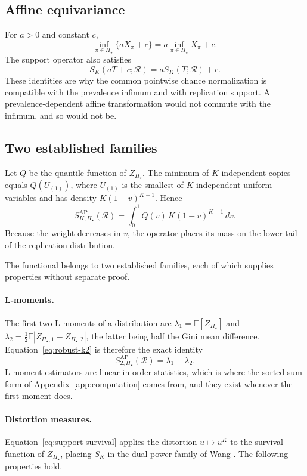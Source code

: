\documentclass[11pt]{article}
\newcommand{\Regime}{\mathcal{R}}
\newcommand{\PSet}{\Pi_\star}
\newcommand{\E}{\mathbb{E}}
\theoremstyle{remark}
\begin{document}
\subsection{Affine equivariance}

For $a>0$ and constant $c$,
\[
\inf_{\pi\in\PSet}\{aX_\pi+c\}
=
a\inf_{\pi\in\PSet}X_\pi+c.
\]
The support operator also satisfies
\[
S_K(aT+c;\Regime)
=
aS_K(T;\Regime)+c.
\]
These identities are why the common pointwise chance normalization is compatible with the prevalence infimum and with replication support. A prevalence-dependent affine transformation would not commute with the infimum, and so would not be.

\subsection{Two established families}
\label{app:families}

Let $Q$ be the quantile function of $Z_{\PSet}$. The minimum of $K$ independent copies equals $Q(U_{(1)})$, where $U_{(1)}$ is the smallest of $K$ independent uniform variables and has density $K(1-v)^{K-1}$. Hence
\begin{equation}
S_{K,\PSet}^{\mathrm{AP}}(\Regime)
=
\int_0^1
Q(v)\,K(1-v)^{K-1}\,dv.
\label{eq:quantile-weight}
\end{equation}
Because the weight decreases in $v$, the operator places its mass on the lower tail of the replication distribution.

The functional belongs to two established families, each of which supplies properties without separate proof.

\paragraph{L-moments.}
The first two L-moments of a distribution \cite{hosking1990lmoments} are $\lambda_1=\E[Z_{\PSet}]$ and $\lambda_2=\tfrac12\E|Z_{\PSet,1}-Z_{\PSet,2}|$, the latter being half the Gini mean difference. Equation~\eqref{eq:robust-k2} is therefore the exact identity
\[
S_{2,\PSet}^{\mathrm{AP}}(\Regime)
=
\lambda_1-\lambda_2 .
\]
L-moment estimators are linear in order statistics, which is where the sorted-sum form of Appendix~\ref{app:computation} comes from, and they exist whenever the first moment does.

\paragraph{Distortion measures.}
Equation~\eqref{eq:support-survival} applies the distortion $u\mapsto u^{K}$ to the survival function of $Z_{\PSet}$, placing $S_K$ in the dual-power family of Wang \cite{wang1996premium}. The following properties hold.
\end{document}
